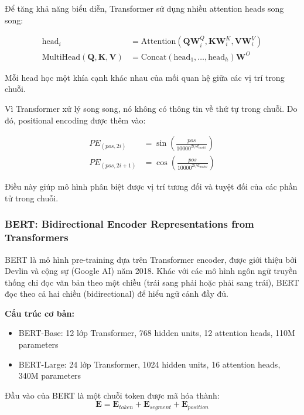 
Để tăng khả năng biểu diễn, Transformer sử dụng nhiều attention heads song song:

\begin{align}
\text{head}_i &= \text{Attention}(\mathbf{Q}\mathbf{W}_i^Q, \mathbf{K}\mathbf{W}_i^K, \mathbf{V}\mathbf{W}_i^V) \\
\text{MultiHead}(\mathbf{Q}, \mathbf{K}, \mathbf{V}) &= \text{Concat}(\text{head}_1, \dots, \text{head}_h)\mathbf{W}^O
\end{align}

Mỗi head học một khía cạnh khác nhau của mối quan hệ giữa các vị trí trong chuỗi.


Vì Transformer xử lý song song, nó không có thông tin về thứ tự trong chuỗi. Do đó, positional encoding được thêm vào:

\begin{align}
PE_{(pos, 2i)} &= \sin\left(\frac{pos}{10000^{2i/d_{model}}}\right) \\
PE_{(pos, 2i+1)} &= \cos\left(\frac{pos}{10000^{2i/d_{model}}}\right)
\end{align}

Điều này giúp mô hình phân biệt được vị trí tương đối và tuyệt đối của các phần tử trong chuỗi.

\subsubsection{BERT: Bidirectional Encoder Representations from Transformers}


BERT là mô hình pre-training dựa trên Transformer encoder, được giới thiệu bởi Devlin và cộng sự (Google AI) năm 2018. Khác với các mô hình ngôn ngữ truyền thống chỉ đọc văn bản theo một chiều (trái sang phải hoặc phải sang trái), BERT đọc theo cả hai chiều (bidirectional) để hiểu ngữ cảnh đầy đủ.

\textbf{Cấu trúc cơ bản:}
\begin{itemize}
    \item BERT-Base: 12 lớp Transformer, 768 hidden units, 12 attention heads, 110M parameters
    \item BERT-Large: 24 lớp Transformer, 1024 hidden units, 16 attention heads, 340M parameters
\end{itemize}

Đầu vào của BERT là một chuỗi token được mã hóa thành:
\begin{equation}
\mathbf{E} = \mathbf{E}_{token} + \mathbf{E}_{segment} + \mathbf{E}_{position}
\end{equation}

